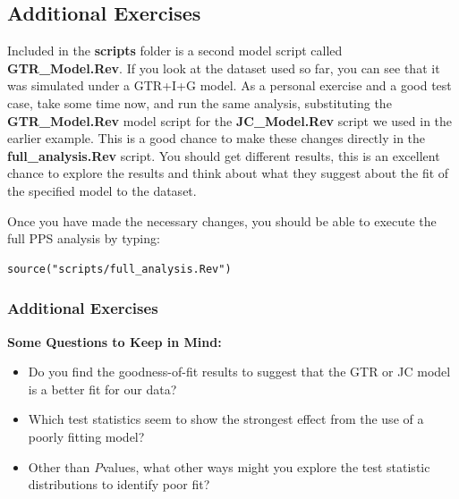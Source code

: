 \begin{equation *}
\begin{equation *}
\begin{equation *}
\subsection{Additional Exercises}

Included in the \textbf{scripts} folder is a second model script called \textbf{GTR\_Model.Rev}. 
If you look at the dataset used so far, you can see that it was simulated under a GTR+I+G model. 
As a personal exercise and a good test case, take some time now, and run the same analysis, substituting
the \textbf{GTR\_Model.Rev} model script for the \textbf{JC\_Model.Rev} script we used in the earlier example.
This is a good chance to make these changes directly in the \textbf{full\_analysis.Rev} script.  
You should get different results, this is an excellent chance to explore the results and think about what
they suggest about the fit of the specified model to the dataset. 

Once you have made the necessary changes, you should be able to execute the full PPS analysis by typing:

{\tt \begin{Snugshade}[184,207,236]
\begin{lstlisting}  
source("scripts/full_analysis.Rev")
\end{lstlisting}
\end{Snugshade}}

\newpage
\subsubsection{Additional Exercises}
\textbf{Some Questions to Keep in Mind:}
\begin{itemize}
  \item Do you find the goodness-of-fit results to suggest that the GTR or JC model is a better fit for our data? 
  \item Which test statistics seem to show the strongest effect from the use of a poorly fitting model?
  \item Other than \textit{P}\-values, what other ways might you explore the test statistic distributions to identify poor fit?
\end{itemize}


\end{equation *}
\end{equation *}
\end{equation *}
